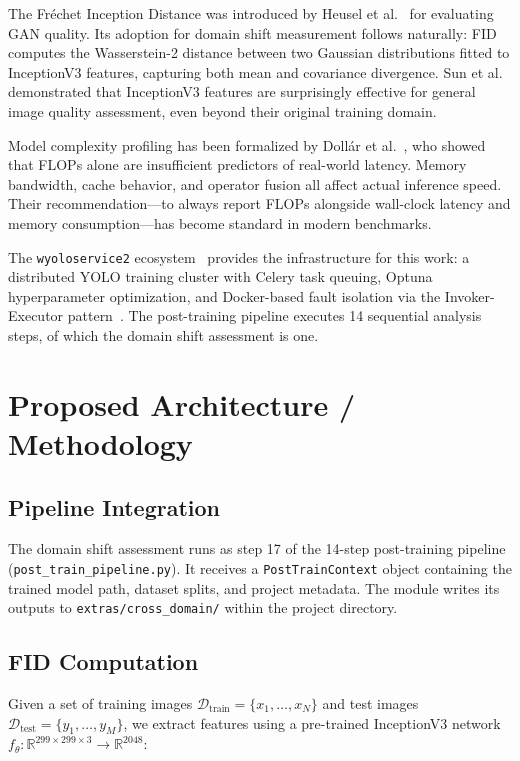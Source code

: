 \documentclass[10pt,twocolumn,letterpaper]{article}
\begin{document}
The Fr\'echet Inception Distance was introduced by Heusel et al.~\cite{heusel2017gans} for evaluating GAN quality. Its adoption for domain shift measurement follows naturally: FID computes the Wasserstein-2 distance between two Gaussian distributions fitted to InceptionV3 features, capturing both mean and covariance divergence. Sun et al.~\cite{sun2017revisiting} demonstrated that InceptionV3 features are surprisingly effective for general image quality assessment, even beyond their original training domain.

Model complexity profiling has been formalized by Doll\'{a}r et al.~\cite{dollar2021rethinking}, who showed that FLOPs alone are insufficient predictors of real-world latency. Memory bandwidth, cache behavior, and operator fusion all affect actual inference speed. Their recommendation---to always report FLOPs alongside wall-clock latency and memory consumption---has become standard in modern benchmarks.

The \texttt{wyoloservice2} ecosystem~\cite{wyoloservice2} provides the infrastructure for this work: a distributed YOLO training cluster with Celery task queuing, Optuna hyperparameter optimization, and Docker-based fault isolation via the Invoker-Executor pattern~\cite{invoker2026}. The post-training pipeline executes 14 sequential analysis steps, of which the domain shift assessment is one.

\section{Proposed Architecture / Methodology}

\subsection{Pipeline Integration}
The domain shift assessment runs as step 17 of the 14-step post-training pipeline (\texttt{post\_train\_pipeline.py}). It receives a \texttt{PostTrainContext} object containing the trained model path, dataset splits, and project metadata. The module writes its outputs to \texttt{extras/cross\_domain/} within the project directory.

\subsection{FID Computation}
Given a set of training images $\mathcal{D}_{\text{train}} = \{x_1, \ldots, x_N\}$ and test images $\mathcal{D}_{\text{test}} = \{y_1, \ldots, y_M\}$, we extract features using a pre-trained InceptionV3 network $f_\theta: \mathbb{R}^{299 \times 299 \times 3} \rightarrow \mathbb{R}^{2048}$:
\end{document}
